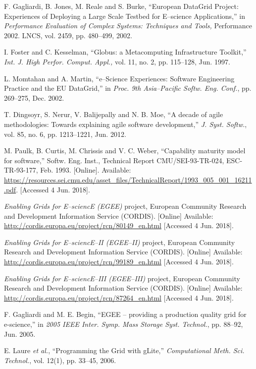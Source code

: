 \documentclass[journal]{IEEEtran}
\begin{document}
\begin{thebibliography}{1}
F. Gagliardi, B. Jones, M. Reale and S. Burke,
``European DataGrid Project: Experiences of Deploying a Large Scale Testbed for E--science Applications,''
in \emph{Performance Evaluation of Complex Systems: Techniques and Tools,}
Performance 2002. LNCS, vol. 2459, pp. 480--499, 2002.

I. Foster and C. Kesselman,
``Globus: a Metacomputing Infrastructure Toolkit,''
\emph{Int. J. High Perfor. Comput. Appl.,}
vol. 11, no. 2, pp. 115--128, Jun. 1997.

L. Momtahan and A. Martin,
``e--Science Experiences: Software Engineering Practice and the EU DataGrid,''
in \emph{Proc. 9th Asia--Pacific Softw. Eng. Conf.},
pp. 269--275, Dec. 2002.

T. Dingsoyr, S. Nerur, V. Balijepally and N. B. Moe,
``A decade of agile methodologies: Towards explaining agile software development,''
\emph{J. Syst. Softw.},
vol. 85, no. 6, pp. 1213--1221, Jun. 2012.

M. Paulk, B. Curtis, M. Chrissis and V. C. Weber,
``Capability maturity model for software,''
Softw. Eng. Inst.,
Technical Report CMU/SEI-93-TR-024, ESC-TR-93-177, Feb. 1993.
[Online]. Available: \url{https://resources.sei.cmu.edu/asset_files/TechnicalReport/1993_005_001_16211.pdf}.
[Accessed 4 Jun. 2018].

\emph{Enabling Grids for E--sciencE (EGEE)} project, European Community Research and
Development Information Service (CORDIS).
[Online] Available: \url{http://cordis.europa.eu/project/rcn/80149_en.html}
[Accessed 4 Jun. 2018].

\emph{Enabling Grids for E--sciencE--II (EGEE--II)} project, European Community Research and
Development Information Service (CORDIS).
[Online] Available: \url{http://cordis.europa.eu/project/rcn/99189_en.html}
[Accessed 4 Jun. 2018].

\emph{Enabling Grids for E--sciencE--III (EGEE--III)} project, European Community
Research and Development Information Service (CORDIS).
[Online] Available: \url{http://cordis.europa.eu/project/rcn/87264_en.html}
[Accessed 4 Jun. 2018].

F. Gagliardi and M. E. Begin,
``EGEE -- providing a production quality grid for e-science,''
in \emph{2005 IEEE Inter. Symp. Mass Storage Syst. Technol.},
pp. 88--92, Jun. 2005.


E. Laure \emph{et al.},
``Programming the Grid with gLite,''
\emph{Computational Meth. Sci. Technol.},
vol. 12(1), pp. 33--45, 2006.


\end{thebibliography}
\end{document}
